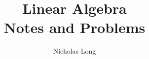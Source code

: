 

\usepackage[all]{xy}
\usepackage{color,graphicx}
%
\InstructorVersion
%
\newcommand\Rn{$\mathbb{R}^n$}
\newcommand\Rm{$\mathbb{R}^m$}
\newcommand\R{$\mathbb{R}$}
\newcommand\bq{\begin{question}}
\newcommand\eq{\end{question}}
\newcommand\be{\begin{enumerate}}
\newcommand\ee{\end{enumerate}}
\newtheorem{question}[theorem]{Question}
\renewcommand{\labelenumi}{\alph{enumi})}
\newcount\colveccount
\newcommand*\colvec[1]{
        \global\colveccount#1
        \begin{bmatrix}
        \colvecnext
}
\def\colvecnext#1{
        #1
        \global\advance\colveccount-1
        \ifnum\colveccount>0
                \\
                \expandafter\colvecnext
        \else
                \end{bmatrix}
        \fi
}

\large
\frontmatter
\title{Linear Algebra \\
Notes and Problems}
\author{Nicholas Long}
\maketitle
\tableofcontents

